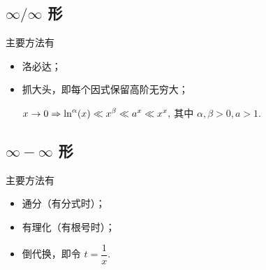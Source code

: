 \subsection{$ \infty/\infty $ 形}

主要方法有\begin{itemize}
    \item 洛必达；
    \item 抓大头，即每个因式保留高阶无穷大；
    
    $\displaystyle x\rightarrow 0 \Rightarrow \ln^\alpha(x)\ll x^\beta \ll a^x \ll x^x, $ 
    其中 $ \alpha,\beta > 0, a > 1. $ 
\end{itemize}

\subsection{$ \infty - \infty $ 形}

主要方法有\begin{itemize}
    \item 通分（有分式时）；
    \item 有理化（有根号时）；
    \item 倒代换，即令 $ t = \dfrac{1}{x}. $ 
\end{itemize}

